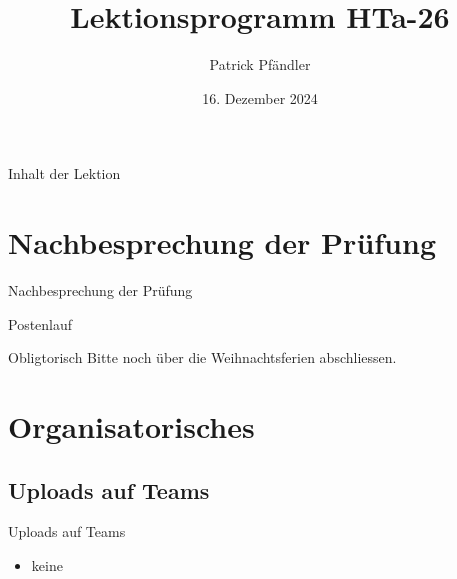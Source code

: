 





\title{\textbf{Lektionsprogramm HTa-26}}
\author{Patrick Pfändler}
\date{16. Dezember 2024}




\frame{\titlepage}

\begin{frame}{Inhalt der Lektion}
	\tableofcontents
\end{frame}


\section{Nachbesprechung der Prüfung}
\BlueSectionSlide
\begin{frame}{Nachbesprechung der Prüfung}
\end{frame}



\begin{frame}{Postenlauf}
	\begin{block}{Obligtorisch}
		Bitte noch über die Weihnachtsferien abschliessen.
	\end{block}
\end{frame}






\section{Organisatorisches}
\BlueSectionSlide

\subsection{Uploads auf Teams}
\begin{frame}{Uploads auf Teams}
	\begin{itemize}
		\item[\textbullet] keine
	\end{itemize}
	        
\end{frame}

        

\folieFragen

